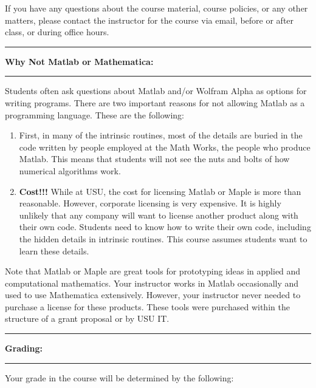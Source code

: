 \documentclass[10pt,fleqn]{article}
\begin{document}
\noindent
If you have any questions about the course material, course policies, or any
other matters, please contact the instructor for the course via email, before
or after class, or during office hours.
\vskip0.1in\hrule\vskip0.1in
\noindent
{\bf Why Not Matlab or Mathematica:}
\vskip0.1in\hrule\vskip0.1in
\noindent
Students often ask questions about Matlab and/or Wolfram Alpha as options for
writing programs. There are two important reasons for not allowing Matlab as a
programming language. These are the following:
\begin{enumerate}
\item First, in many of the intrinsic routines, most of the details are buried
      in the code written by people employed at the Math Works, the people who
      produce Matlab. This means that students will not see the nuts and bolts
      of how numerical algorithms work.
\item {\bf Cost!!!} While at USU, the cost for licensing Matlab or Maple is
      more than reasonable. However, corporate licensing is very expensive. It
      is highly unlikely that any company will want to license another product
      along with their own code. Students need to know how to write their own
      code, including the hidden details in intrinsic routines. This course
      assumes students want to learn these details.
\end{enumerate}
Note that Matlab or Maple are great tools for prototyping ideas in applied and
computational mathematics. Your instructor works in Matlab occasionally and used
to use Mathematica extensively. However, your instructor never needed to
purchase a license for these products. These tools were purchased within the
structure of a grant proposal or by USU IT.
\vskip0.1in\hrule\vskip0.1in
\noindent
{\bf Grading:}
\vskip0.1in\hrule\vskip0.1in
\noindent
Your grade in the course will be determined by the following:
\end{document}
